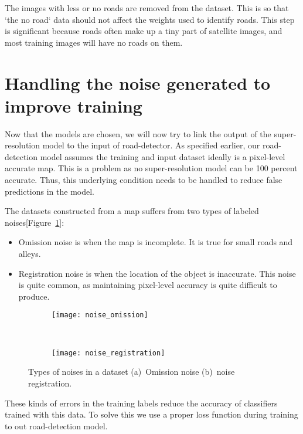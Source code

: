 The images with less or no roads are removed from the dataset. This is so that `the no road` data should not affect the weights used to identify roads. This step is significant because roads often make up a tiny part of satellite images, and most training images will have no roads on them.


\section{Handling the noise generated to improve training}
Now that the models are chosen, we will now try to link the output of the super-resolution model to the input of road-detector. As specified earlier, our road-detection model assumes the training and input dataset ideally is a pixel-level accurate map. This is a problem as no super-resolution model can be 100 percent accurate. Thus, this underlying condition needs to be handled to reduce false predictions in the model.

The datasets constructed from a map suffers from two types of labeled noises[Figure~\ref{fig:noise_types}]:
\begin{itemize}
  \item Omission noise is when the map is incomplete. It is true for small roads and alleys.
  \item Registration noise is when the location of the object is inaccurate. This noise is quite common, as maintaining pixel-level accuracy is quite difficult to produce.
\end{itemize}

\begin{figure}[h!]
  \centering
  \begin{subfigure}{0.63\textwidth}
    \texttt{[image: noise\_omission]}
    \caption{}
  \end{subfigure}~
  \begin{subfigure}{0.35\textwidth}
    \texttt{[image: noise\_registration]}
    \caption{}
  \end{subfigure}
  \caption[Types of noises in a dataset]{Types of noises in a dataset (a)~Omission noise (b)~noise registration.}
  \label{fig:noise_types}
\end{figure}

These kinds of errors in the training labels reduce the accuracy of classifiers trained with this data. To solve this we use a proper loss function during training to out road-detection model.

